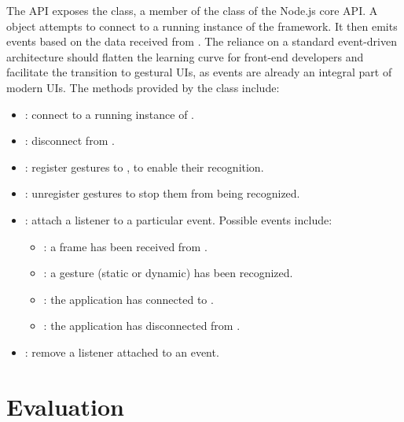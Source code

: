 The \ql API exposes the  class, a member of the  class of the Node.js core API. A  object attempts to connect to a running instance of the \ql framework. It then emits events based on the data received from \ql. %
The reliance on a standard event-driven architecture should flatten the learning curve for front-end developers and facilitate the transition to gestural UIs, as events are already an integral part of modern UIs. The methods provided by the  class include:
\begin{itemize}[noitemsep]
    \item {}: connect to a running instance of \ql.
    \item {}: disconnect from \ql.
    \item {}: register gestures to \ql, to enable their recognition.
    \item {}: unregister gestures to stop them from being recognized.
    \item {}: attach a listener to a particular event. Possible events include:
    \begin{itemize}[noitemsep]
        \item {}: a frame has been received from \ql.
        \item {}: a gesture (static or dynamic) has been recognized.
        \item {}: the application has connected to \ql.
        \item {}: the application has disconnected from \ql.
    \end{itemize}
    \item {}: remove a listener attached to an event.
\end{itemize}

\section{Evaluation} \label{sec:quantumleap:evaluation}

